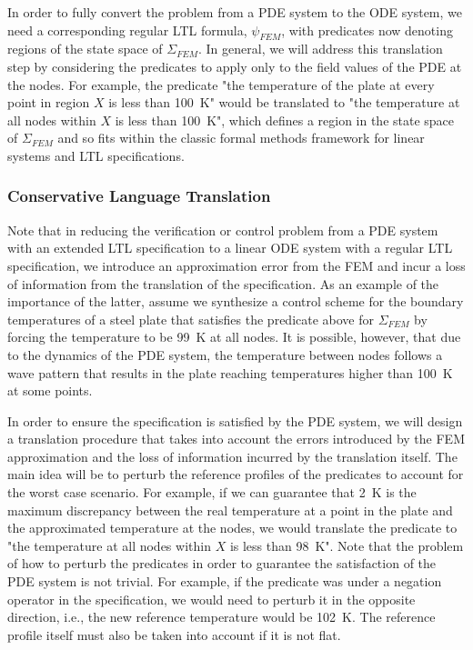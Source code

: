 \documentclass{article}
\begin{document}
In order to fully convert the problem from a PDE system to the ODE system, we need a
corresponding regular LTL formula, $\psi_{FEM}$, with predicates now denoting regions of the
state space of $\Sigma_{FEM}$. In general, we will address this translation step
by considering the predicates to apply only to the field values of the PDE at
the nodes. For example, the predicate "the temperature of the plate at every
point in region
$X$ is less than \SI{100}{\kelvin}" would be translated to "the temperature at
all nodes within $X$ is less than \SI{100}{\kelvin}", which defines a region in
the state space of $\Sigma_{FEM}$ and so fits within the classic formal methods
framework for linear systems and LTL specifications.

\subsubsection{Conservative Language Translation}
\label{ssub:Language translation}

Note that in reducing the verification or control problem from a PDE system with
an extended LTL specification to a linear ODE system with a regular LTL
specification, we introduce an approximation error from the FEM and incur a loss of
information from the translation of the specification. As an example of 
the importance of the latter,
assume we synthesize a control scheme for the boundary temperatures of a steel plate
that satisfies the predicate above for $\Sigma_{FEM}$ by forcing the temperature
to be \SI{99}{\kelvin} at all nodes. It is possible, however, that due to the
dynamics of the PDE system, the temperature between nodes follows a wave pattern
that results in the plate reaching temperatures higher than \SI{100}{\kelvin} at
some points. 

In order to ensure the specification is satisfied by the PDE system, we will
design a translation procedure that takes into account the errors introduced by
the FEM approximation and the loss of information incurred by the translation
itself. The main idea will be to perturb the reference profiles of the
predicates to account for the worst case scenario. For example, if we can
guarantee that \SI{2}{\kelvin} is the maximum discrepancy between the real
temperature at a point in the plate and the approximated temperature at the
nodes, we would translate the predicate to "the temperature at all nodes within
$X$ is less than \SI{98}{\kelvin}". Note that the problem of how to perturb the
predicates in order to guarantee the satisfaction of the PDE system is not
trivial. For example, if the predicate was under a negation operator in the
specification, we would need to perturb it in the opposite direction, i.e., the new
reference temperature would be \SI{102}{\kelvin}. The reference profile itself
must also be taken into account if it is not flat.
\end{document}
